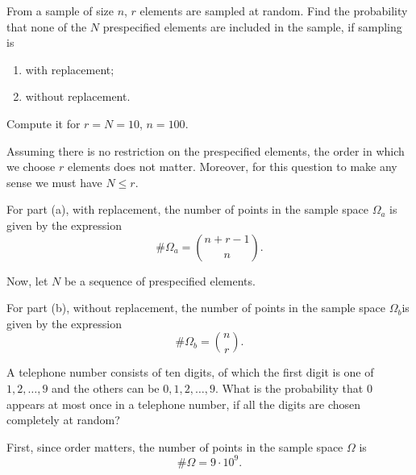 \begin{problem}
  From a sample of size \(n\), \(r\) elements are sampled at random. Find
  the probability that none of the \(N\) prespecified elements are included
  in the sample, if sampling is
  \begin{enumerate}[label=(\alph*)]
  \item with replacement;
  \item without replacement.
  \end{enumerate}
  Compute it for \(r=N=10\), \(n=100\).
\end{problem}
\begin{solution}
  Assuming there is no restriction on the prespecified elements, the order
  in which we choose \(r\) elements does not matter. Moreover, for this
  question to make any sense we must have \(N\leq r\).

  For part (a), with replacement, the number of points in the sample space
  \(\Omega_a\) is given by the expression
  \begin{equation}
    \label{eq:1-6}
    \#\Omega_a=\binom{n+r-1}{n}.
  \end{equation}

  Now, let \(N\) be a sequence of prespecified elements.

  For part (b), without replacement, the number of points in the sample
  space \(\Omega_b\)is given by the expression
  \begin{equation}
    \label{eq:1-7}
    \#\Omega_b=\binom{n}{r}.
  \end{equation}

\end{solution}
\newpage

\begin{problem}
  A telephone number consists of ten digits, of which the first digit is
  one of \(1,2,\dotsc,9\) and the others can be \(0,1,2,\dotsc,9\). What is
  the probability that \(0\) appears at most once in a telephone number, if
  all the digits are chosen completely at random?
\end{problem}
\begin{solution}
  First, since order matters, the number of points in the sample space
  \(\Omega\) is
  \begin{equation}
    \label{eq:1-ex}
    \#\Omega=9\cdot 10^9.
  \end{equation}
\end{solution}
\newpage

